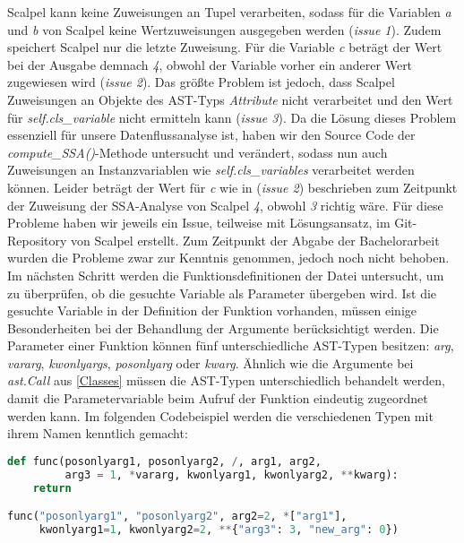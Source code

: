 \documentclass[german,bachelor]{swsLeipzig}
\begin{document}
Scalpel kann keine Zuweisungen an Tupel verarbeiten, sodass für die Variablen \textit{a} und \textit{b}
von Scalpel keine Wertzuweisungen ausgegeben werden (\textit{issue 1}).
Zudem speichert Scalpel nur die letzte Zuweisung.
Für die Variable \textit{c} beträgt der Wert bei der Ausgabe demnach \textit{4}, obwohl der Variable vorher ein anderer
Wert zugewiesen wird (\textit{issue 2}).
Das größte Problem ist jedoch, dass Scalpel Zuweisungen an Objekte des AST-Typs \textit{Attribute} nicht verarbeitet
und den Wert für \textit{self.cls\_variable} nicht ermitteln kann (\textit{issue 3}).
Da die Lösung dieses Problem essenziell für unsere Datenflussanalyse ist, haben wir den Source Code der \textit{compute\_SSA()}-Methode
untersucht und verändert, sodass nun auch Zuweisungen an Instanzvariablen wie \textit{self.cls\_variables} verarbeitet werden können.
Leider beträgt der Wert für \textit{c} wie in (\textit{issue 2}) beschrieben zum Zeitpunkt der Zuweisung der SSA-Analyse von Scalpel \textit{4}, obwohl
\textit{3} richtig wäre.
Für diese Probleme haben wir jeweils ein Issue, teilweise mit Lösungsansatz, im Git-Repository von Scalpel erstellt.
Zum Zeitpunkt der Abgabe der Bachelorarbeit wurden die Probleme zwar zur Kenntnis genommen, jedoch noch nicht behoben.\\

Im nächsten Schritt werden die Funktionsdefinitionen der Datei untersucht, um zu überprüfen, ob die gesuchte Variable als
Parameter übergeben wird.
Ist die gesuchte Variable in der Definition der Funktion vorhanden, müssen einige Besonderheiten bei der Behandlung der Argumente
berücksichtigt werden.
Die Parameter einer Funktion können fünf unterschiedliche AST-Typen besitzen: \textit{arg}, \textit{vararg}, \textit{kwonlyargs},
\textit{posonlyarg} oder \textit{kwarg}.
Ähnlich wie die Argumente bei \textit{ast.Call} aus \ref{Classes} müssen die AST-Typen unterschiedlich behandelt werden, damit die Parametervariable
beim Aufruf der Funktion eindeutig zugeordnet werden kann.
Im folgenden Codebeispiel werden die verschiedenen Typen mit ihrem Namen kenntlich gemacht: \\

\begin{lstlisting}[language=Python, frame=single, basicstyle=\small]
def func(posonlyarg1, posonlyarg2, /, arg1, arg2,
         arg3 = 1, *vararg, kwonlyarg1, kwonlyarg2, **kwarg):
    return

func("posonlyarg1", "posonlyarg2", arg2=2, *["arg1"],
     kwonlyarg1=1, kwonlyarg2=2, **{"arg3": 3, "new_arg": 0})
\end{lstlisting}
\
\end{document}

